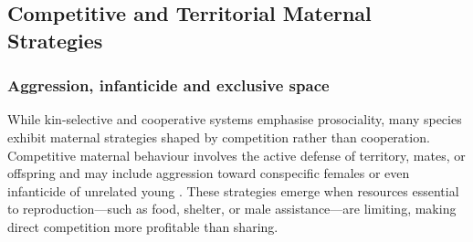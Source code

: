         
        
    \subsection{Competitive and Territorial Maternal Strategies}
        \subsubsection{Aggression, infanticide and exclusive space}
        While kin-selective and cooperative systems emphasise prosociality, many species exhibit maternal strategies shaped by competition rather than cooperation. Competitive maternal behaviour involves the active defense of territory, mates, or offspring and may include aggression toward conspecific females or even infanticide of unrelated young \cite{hrdy1979, stockley2011}. These strategies emerge when resources essential to reproduction—such as food, shelter, or male assistance—are limiting, making direct competition more profitable than sharing.

